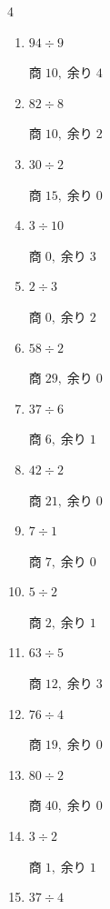 \begin{multicols}{4}
\begin{enumerate}
  \item $94 \div 9$

        $商\; 10,\; 余り\; 4$

  \item $82 \div 8$

        $商\; 10,\; 余り\; 2$

  \item $30 \div 2$

        $商\; 15,\; 余り\; 0$

\columnbreak %

\resetques

  \item $3 \div 10$

        $商\; 0,\; 余り\; 3$

  \item $2 \div 3$

        $商\; 0,\; 余り\; 2$

  \item $58 \div 2$

        $商\; 29,\; 余り\; 0$

  \item $37 \div 6$

        $商\; 6,\; 余り\; 1$

  \item $42 \div 2$

        $商\; 21,\; 余り\; 0$

  \item $7 \div 1$

        $商\; 7,\; 余り\; 0$

  \item $5 \div 2$

        $商\; 2,\; 余り\; 1$

  \item $63 \div 5$

        $商\; 12,\; 余り\; 3$

  \item $76 \div 4$

        $商\; 19,\; 余り\; 0$

  \item $80 \div 2$

        $商\; 40,\; 余り\; 0$

  \item $3 \div 2$

        $商\; 1,\; 余り\; 1$

  \item $37 \div 4$


\end{enumerate}
\end{multicols}
